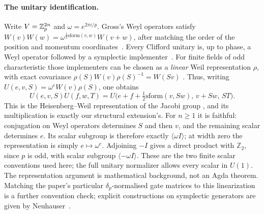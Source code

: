 \paragraph{The unitary identification.}
Write $V=\mathbb{Z}_p^{2n}$ and $\omega=e^{2\pi i/p}$.  Gross's Weyl
operators satisfy $W(v)W(w)=\omega^{\frac12\mathrm{sform}(v,w)}
W(v+w)$, after matching the order of the position and momentum
coordinates~\cite[\S II.1, Eq.~(4)]{gross2006hudson}.
Every Clifford unitary is, up to phase, a Weyl operator followed by
a symplectic implementer~\cite[Theorem~3]{gross2006hudson}.
For finite fields of odd characteristic those implementers can be
chosen as a \emph{linear} Weil representation $\rho$, with exact
covariance $\rho(S)W(v)\rho(S)^{-1}=W(Sv)$
\cite[Theorem~1.3.2]{gurevich2007geometric}.
Thus, writing $U(e,v,S)=\omega^e W(v)\rho(S)$, one obtains
\[
 U(e,v,S)U(f,w,T)
 =U\bigl(e+f+\tfrac12\mathrm{sform}(v,Sw),\,v+Sw,\,ST\bigr).
\]
This is the Heisenberg--Weil representation of the Jacobi group
\cite[\S 1.3]{gurevich2010bounds}, and its multiplication is exactly
our structural extension's.  For $n\geq1$ it is faithful: conjugation
on Weyl operators determines $S$ and then $v$, and the remaining
scalar determines $e$.  Its scalar subgroup is therefore exactly
$\langle\omega I\rangle$; at width zero the representation is simply
$e\mapsto\omega^e$.
Adjoining $-I$ gives a direct product with $\mathbb Z_2$, since $p$ is
odd, with scalar subgroup $\langle-\omega I\rangle$.
These are the two finite scalar conventions used here; the full
unitary normalizer allows every scalar in $U(1)$.
The representation argument is mathematical background, not an Agda
theorem.  Matching the paper's particular $\delta_p$-normalised gate
matrices to this linearization is a further convention check; explicit
constructions on symplectic generators are given by
Neuhauser~\cite{neuhauser2002metaplectic}.


